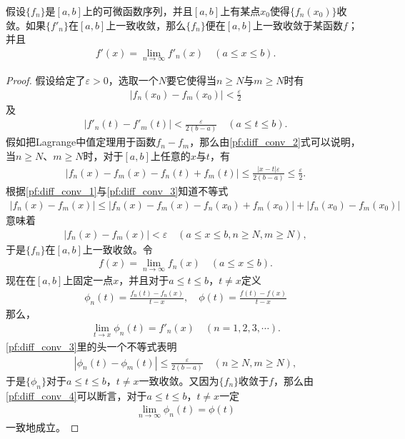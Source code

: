 \documentclass[../../main.tex]{subfiles}%
\begin{document}
\begin{theorem}
假设$\{f_n\}$是$[a,b]$上的可微函数序列，并且$[a,b]$上有某点$x_0$使得$\{f_n(x_0)\}$收敛。如果$\{f'_n\}$在$[a,b]$上一致收敛，那么$\{f_n\}$便在$[a,b]$上一致收敛于某函数$f$；并且
\begin{align}
f'(x) = \lim\limits_{n\to\infty}f'_n(x) \quad (a\leqslant x\leqslant b).
\label{thm:diff_conv_main}
\end{align}
\end{theorem}
\begin{proof}
假设给定了$\varepsilon>0$，选取一个$N$要它使得当$n\geqslant N$与$m\geqslant N$时有
\begin{align}
|f_n(x_0)-f_m(x_0)| < \frac{\varepsilon}{2}
\label{pf:diff_conv_1}
\end{align}
及
\begin{align}
|f'_n(t)-f'_m(t)| < \frac{\varepsilon}{2(b-a)} \quad (a\leqslant t\leqslant b).
\label{pf:diff_conv_2}
\end{align}
假如把Lagrange中值定理用于函数$f_n-f_m$，那么由\eqref{pf:diff_conv_2}式可以说明，当$n\geqslant N$、$m\geqslant N$时，对于$[a,b]$上任意的$x$与$t$，有
\begin{align}
|f_n(x)-f_m(x)-f_n(t)+f_m(t)| \leqslant \frac{|x-t|\varepsilon}{2(b-a)} \leqslant \frac{\varepsilon}{2}.
\label{pf:diff_conv_3}
\end{align}
根据\eqref{pf:diff_conv_1}与\eqref{pf:diff_conv_3}知道不等式
\begin{align*}
|f_n(x)-f_m(x)| \leqslant |f_n(x)-f_m(x)-f_n(x_0)+f_m(x_0)| + |f_n(x_0)-f_m(x_0)|
\end{align*}
意味着
\begin{align*}
|f_n(x)-f_m(x)| < \varepsilon \quad (a\leqslant x\leqslant b, n\geqslant N, m\geqslant N),
\end{align*}
于是$\{f_n\}$在$[a,b]$上一致收敛。令
\begin{align*}
f(x) = \lim\limits_{n\to\infty}f_n(x) \quad (a\leqslant x\leqslant b).
\end{align*}
现在在$[a,b]$上固定一点$x$，并且对于$a\leqslant t\leqslant b$，$t\neq x$定义
\begin{align}
\phi_n(t) = \frac{f_n(t)-f_n(x)}{t-x}, \quad \phi(t) = \frac{f(t)-f(x)}{t-x}
\label{pf:diff_conv_4}
\end{align}
那么，
\begin{align}
\lim\limits_{t\to x}\phi_n(t) = f'_n(x) \quad (n=1,2,3,\cdots).
\label{pf:diff_conv_5}
\end{align}
\eqref{pf:diff_conv_3}里的头一个不等式表明
\begin{align*}
|\phi_n(t)-\phi_m(t)| \leqslant \frac{\varepsilon}{2(b-a)} \quad (n\geqslant N, m\geqslant N),
\end{align*}
于是$\{\phi_n\}$对于$a\leqslant t\leqslant b$，$t\neq x$一致收敛。又因为$\{f_n\}$收敛于$f$，那么由\eqref{pf:diff_conv_4}可以断言，对于$a\leqslant t\leqslant b$，$t\neq x$一定
\begin{align}
\lim\limits_{n\to\infty}\phi_n(t) = \phi(t)
\label{pf:diff_conv_6}
\end{align}
一致地成立。


\end{proof}
\end{document}
